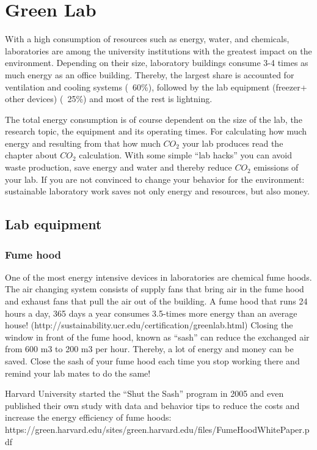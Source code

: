 
\chapter{Green Lab}

With a high consumption of resources such as energy, water, and chemicals, laboratories are among the university institutions with the greatest impact on the environment. Depending on their size, laboratory buildings consume 3-4 times as much energy as an office building. Thereby, the largest share is accounted for ventilation and cooling systems (~60\%), followed by the lab equipment (freezer+ other devices) (~25\%) and most of the rest is lightning. 

The total energy consumption is of course dependent on the size of the lab, the research topic, the equipment and its operating times. For calculating how much energy and resulting from that how much $CO_2$ your lab produces read the chapter about $CO_{2}$ calculation. 
With some simple “lab hacks” you can avoid waste production, save energy and water and thereby reduce $CO_{2}$ emissions of your lab. 
If you are not convinced to change your behavior for the environment: sustainable laboratory work saves not only energy and resources, but also money.

\section{Lab equipment}

\subsection{Fume hood}
One of the most energy intensive devices in laboratories are chemical fume hoods. The air changing system consists of supply fans that bring air in the fume hood and exhaust fans that pull the air out of the building.  A fume hood that runs 24 hours a day, 365 days a year consumes 3.5-times more energy than an average house! (http://sustainability.ucr.edu/certification/greenlab.html) Closing the window in front of the fume hood, known as “sash” can reduce the exchanged air from 600 m3 to 200 m3 per hour. Thereby, a lot of energy and money can be saved.
Close the sash of your fume hood each time you stop working there and remind your lab mates to do the same! 


Harvard University started the “Shut the Sash” program in 2005 and even published their own study with data and behavior tips to reduce the costs and increase the energy efficiency of fume hoods:      
https://green.harvard.edu/sites/green.harvard.edu/files/FumeHoodWhitePaper.pdf

